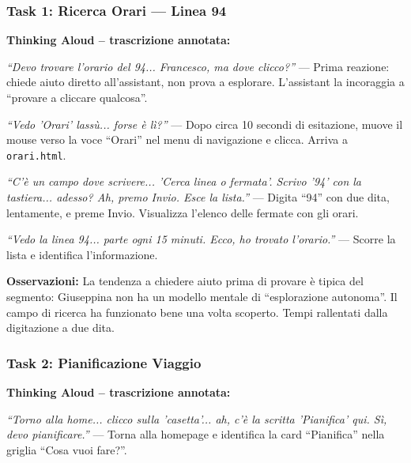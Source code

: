 \documentclass[11pt,a4paper]{article}
\begin{document}
\begin{tcolorbox}[colback=backgroundColor,colframe=borderColor,arc=2mm]
\small

\subsubsection*{Task 1: Ricerca Orari --- Linea 94}
\textbf{Thinking Aloud -- trascrizione annotata:}

\vspace{0.2cm}
\noindent\textit{``Devo trovare l'orario del 94... Francesco, ma dove clicco?''} --- Prima reazione: chiede aiuto diretto all'assistant, non prova a esplorare. L'assistant la incoraggia a ``provare a cliccare qualcosa''.

\vspace{0.1cm}
\noindent\textit{``Vedo 'Orari' lass\`u... forse \`e l\`i?''} --- Dopo circa 10 secondi di esitazione, muove il mouse verso la voce ``Orari'' nel menu di navigazione e clicca. Arriva a \texttt{orari.html}.

\vspace{0.1cm}
\noindent\textit{``C'\`e un campo dove scrivere... 'Cerca linea o fermata'. Scrivo '94' con la tastiera... adesso? Ah, premo Invio. Esce la lista.''} --- Digita ``94'' con due dita, lentamente, e preme Invio. Visualizza l'elenco delle fermate con gli orari.

\vspace{0.1cm}
\noindent\textit{``Vedo la linea 94... parte ogni 15 minuti. Ecco, ho trovato l'orario.''} --- Scorre la lista e identifica l'informazione.

\vspace{0.1cm}
\noindent\textbf{Osservazioni:} La tendenza a chiedere aiuto prima di provare \`e tipica del segmento: Giuseppina non ha un modello mentale di ``esplorazione autonoma''. Il campo di ricerca ha funzionato bene una volta scoperto. Tempi rallentati dalla digitazione a due dita.

\vspace{0.3cm}
\subsubsection*{Task 2: Pianificazione Viaggio}
\textbf{Thinking Aloud -- trascrizione annotata:}

\vspace{0.2cm}
\noindent\textit{``Torno alla home... clicco sulla 'casetta'... ah, c'\`e la scritta 'Pianifica' qui. S\`i, devo pianificare.''} --- Torna alla homepage e identifica la card ``Pianifica'' nella griglia ``Cosa vuoi fare?''.


\end{tcolorbox}
\end{document}
